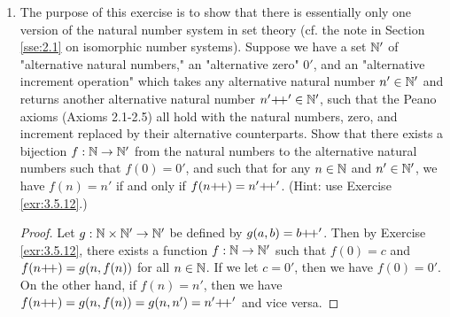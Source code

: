 \documentclass[../main.tex]{subfiles}
\begin{document}
\begin{enumerate}[ref={\thesection.\arabic*}]
\begin{proof}
    \end{proof}
    \item \label{exr:3.5.13}The purpose of this exercise is to show that there is essentially only one version of the natural number system in set theory (cf. the note in Section \ref{sse:2.1} on isomorphic number systems). Suppose we have a set $\mathbb{N}'$ of "alternative natural numbers," an "alternative zero" $0'$, and an "alternative increment operation" which takes any alternative natural number $n'\in\mathbb{N}'$ and returns another alternative natural number $n'{+\!+}'\in\mathbb{N}'$, such that the Peano axioms (Axioms 2.1-2.5) all hold with the natural numbers, zero, and increment replaced by their alternative counterparts. Show that there exists a bijection $f:\mathbb{N}\to\mathbb{N}'$ from the natural numbers to the alternative natural numbers such that $f(0)=0'$, and such that for any $n\in\mathbb{N}$ and $n'\in\mathbb{N}'$, we have $f(n)=n'$ if and only if $f(n{+\!+})=n'{+\!+}'$. (Hint: use Exercise \ref{exr:3.5.12}.)
    \begin{proof}
        Let $g:\mathbb{N}\times\mathbb{N}'\to\mathbb{N}'$ be defined by $g(a,b)=b{+\!+}'$. Then by Exercise \ref{exr:3.5.12}, there exists a function $f:\mathbb{N}\to\mathbb{N}'$ such that $f(0)=c$ and $f(n{+\!+})=g(n,f(n))$ for all $n\in\mathbb{N}$. If we let $c=0'$, then we have $f(0)=0'$. On the other hand, if $f(n)=n'$, then we have $f(n{+\!+})=g(n,f(n))=g(n,n')=n'{+\!+}'$ and vice versa.
    \end{proof}
\end{enumerate}
\end{document}
